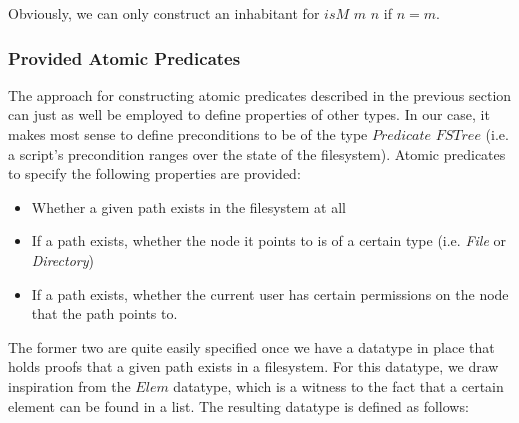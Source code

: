 \documentclass[12pt,a4paper]{article}
\begin{document}
Obviously, we can only construct an inhabitant for $isM$ $m$ $n$ if $n = m$. 

\subsubsection{Provided Atomic Predicates}

The approach for constructing atomic predicates described in the previous section can just as well be employed to define properties of other types. In our case, it makes most sense to define preconditions to be of the type $Predicate$ $FSTree$ (i.e. a script's precondition ranges over the state of the filesystem).  Atomic predicates to specify the following properties are provided: 

\begin{itemize}
\item 
Whether a given path exists in the filesystem at all 

\item
If a path exists, whether the node it points to is of a certain type (i.e. \textit{File} or \textit{Directory}) 

\item 
If a path exists, whether the current user has certain permissions on the node that the path points to. 
\end{itemize}

The former two are quite easily specified once we have a datatype in place that holds proofs that a given path exists in a filesystem. For this datatype, we draw inspiration from the $Elem$ datatype, which is a witness to the fact that a certain element can be found in a list. The resulting datatype is defined as follows: 
\end{document}
